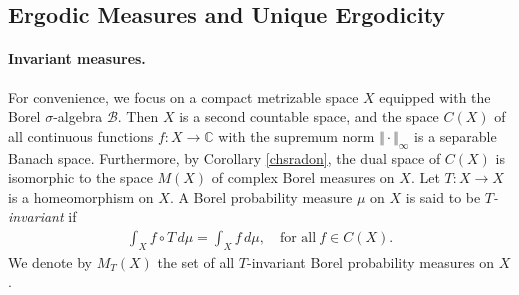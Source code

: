 \documentclass{article}
\numberwithin{equation}{section}
\newcommand{\bbC}{\mathbb{C}}
\newcommand{\scr}{\mathscr}
\theoremstyle{plain}
\theoremstyle{definition}
\begin{document}
\subsection{Ergodic Measures and Unique Ergodicity}
\paragraph{Invariant measures.} For convenience, we focus on a compact metrizable space $X$ equipped with the Borel $\sigma$-algebra $\scr{B}$. Then $X$ is a second countable space, and the space $C(X)$ of all continuous functions $f:X\to\bbC$ with the supremum norm $\Vert\cdot\Vert_\infty$ is a separable Banach space. Furthermore, by Corollary \ref{chsradon}, the dual space of $C(X)$ is isomorphic to the space $M(X)$ of complex Borel measures on $X$. Let $T:X\to X$ is a homeomorphism on $X$. A Borel probability measure $\mu$ on $X$ is said to be \textit{$T$-invariant} if 
\begin{align*}
	\int_X f\circ T\,d\mu=\int_X f\,d\mu,\quad\text{for all}\ f\in C(X).
\end{align*}
We denote by $M_T(X)$ the set of all $T$-invariant Borel probability measures on $X$.
\end{document}
